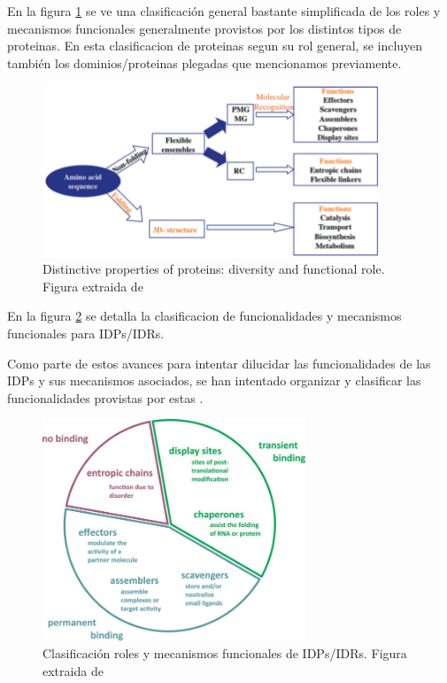 En la figura \ref{proteinMechanisms} se ve una clasificación general bastante simplificada de los roles y mecanismos funcionales generalmente provistos por los distintos tipos de proteinas. 
En esta clasificacion de proteinas segun su rol general, se incluyen también los dominios/proteinas plegadas que mencionamos previamente.

\begin{figure}[h!,centered]
\centering
\includegraphics[width=0.9\textwidth]{img/proteinFunctionMechanisms.png} 
\caption{Distinctive properties of proteins: diversity and functional role. Figura extraida de \cite{habchi2014introducing} }
\label{proteinMechanisms}
\end{figure}


En la figura \ref{idpFunctions} se detalla la clasificacion de funcionalidades y mecanismos funcionales para IDPs/IDRs.


Como parte de estos avances para intentar dilucidar las funcionalidades de las IDPs y sus mecanismos asociados, se han intentado organizar y clasificar las funcionalidades provistas por estas \cite{van2014classification}.


\begin{figure}[h!,centered]
\centering
\includegraphics[width=0.7\textwidth]{img/idpFunctionMechanisms.jpg} 
\caption{Clasificación roles y mecanismos funcionales de IDPs/IDRs. Figura extraida de \cite{van2014classification}}
\label{idpFunctions}
\end{figure}


